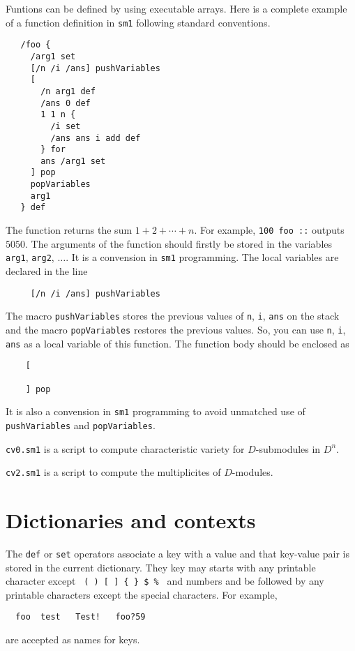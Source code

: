 Funtions can be defined by using executable arrays.
Here is a complete example of a function definition in {\tt sm1}
following standard conventions.
\begin{verbatim}
   /foo {
     /arg1 set
     [/n /i /ans] pushVariables
     [
       /n arg1 def
       /ans 0 def
       1 1 n {
         /i set
         /ans ans i add def
       } for
       ans /arg1 set
     ] pop
     popVariables
     arg1
   } def
\end{verbatim}
The function returns the sum $1+2+\cdots+ n$.
For example, 
{\tt 100 foo ::} outputs $5050$.
The arguments of the function should firstly be stored in the variables
{\tt arg1}, {\tt arg2}, $\ldots$.
It is a convension in {\tt sm1} programming.
The local variables are declared in the line
\begin{verbatim}
     [/n /i /ans] pushVariables
\end{verbatim}
The macro {\tt pushVariables} stores the previous values of
{\tt n}, {\tt i}, {\tt ans} on the stack and
the macro {\tt popVariables} restores the previous values.
So, you can use {\tt n}, {\tt i}, {\tt ans}
as a local variable of this function.
The function body should be enclosed as
\begin{verbatim}
    [

    ] pop
\end{verbatim}
It is also a convension in {\tt sm1} programming
to avoid unmatched use of
{\tt pushVariables} and {\tt popVariables}.


\begin{example} \rm
{\tt cv0.sm1} is a script to compute characteristic variety
for $D$-submodules in $D^n$.

{\tt cv2.sm1} is a script to compute the multiplicites of
$D$-modules.
\end{example}


\section{Dictionaries and contexts}

The {\tt def} or {\tt set} operators associate a key with a value
and that key-value pair is stored in the current dictionary.
They key may starts with any printable character except
\verb+ ( ) [ ] { } $ % +
and numbers and be followed by any printable characters
except the special characters.
For example,
\begin{verbatim}
  foo  test   Test!   foo?59
\end{verbatim}
are accepted as names for keys.

